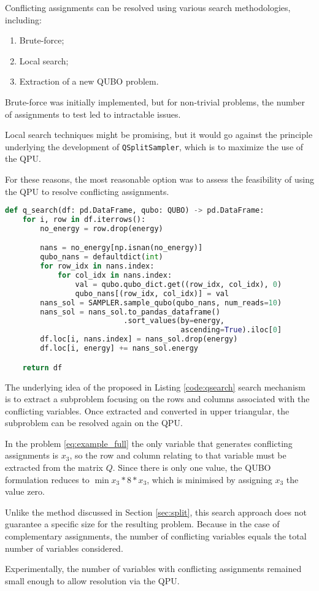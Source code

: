 Conflicting assignments can be resolved using various search methodologies, including: 
\begin{enumerate} 
	\item Brute-force; 
	\item Local search; 
	\item Extraction of a new QUBO problem. 
\end{enumerate}

Brute-force was initially implemented, but for non-trivial problems, the number of assignments to test led to intractable issues.

Local search techniques might be promising, but it would go against the principle underlying the development of \texttt{QSplitSampler}, which is to maximize the use of the QPU.

For these reasons, the most reasonable option was to assess the feasibility of using the QPU to resolve conflicting assignments.

\begin{lstlisting}[language=Python, caption=QUBO extractor function, label=code:qsearch]
def q_search(df: pd.DataFrame, qubo: QUBO) -> pd.DataFrame:
    for i, row in df.iterrows():
        no_energy = row.drop(energy)

        nans = no_energy[np.isnan(no_energy)]
        qubo_nans = defaultdict(int)
        for row_idx in nans.index:
            for col_idx in nans.index:
                val = qubo.qubo_dict.get((row_idx, col_idx), 0)
                qubo_nans[(row_idx, col_idx)] = val
        nans_sol = SAMPLER.sample_qubo(qubo_nans, num_reads=10)
        nans_sol = nans_sol.to_pandas_dataframe()
                           .sort_values(by=energy, 
                                        ascending=True).iloc[0]
        df.loc[i, nans.index] = nans_sol.drop(energy)
        df.loc[i, energy] += nans_sol.energy

    return df
\end{lstlisting}

The underlying idea of the proposed in Listing \ref{code:qsearch} search mechanism is to extract a subproblem focusing on the rows and columns associated with the conflicting variables. 
Once extracted and converted in upper triangular, the subproblem can be resolved again on the QPU.

In the problem \eqref{eq:example_full} the only variable that generates conflicting assignments is $x_3$, so the row and column relating to that variable must be extracted from the matrix $Q$.
Since there is only one value, the QUBO formulation reduces to $\min x_3*8*x_3$, which is minimised by assigning $x_3$ the value zero.

Unlike the method discussed in Section \ref{sec:split}, this search approach does not guarantee a specific size for the resulting problem.
Because in the case of complementary assignments, the number of conflicting variables equals the total number of variables considered. 

Experimentally, the number of variables with conflicting assignments remained small enough to allow resolution via the QPU.